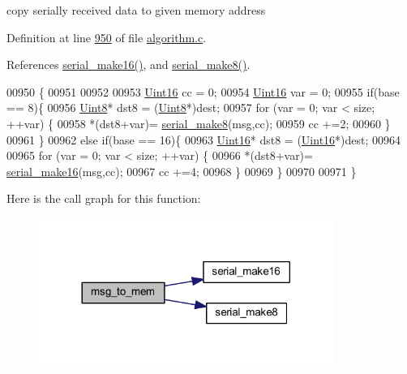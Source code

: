 copy serially received data to given memory address 



Definition at line \hyperlink{a00038_source_l00950}{950} of file \hyperlink{a00038_source}{algorithm.\+c}.



References \hyperlink{a00030_source_l00381}{serial\+\_\+make16()}, and \hyperlink{a00030_source_l00367}{serial\+\_\+make8()}.


\begin{DoxyCode}
00950                                                              \{
00951 
00952  
00953         \hyperlink{a00072_a59a9f6be4562c327cbfb4f7e8e18f08b}{Uint16} cc   = 0;
00954         \hyperlink{a00072_a59a9f6be4562c327cbfb4f7e8e18f08b}{Uint16} var  = 0;
00955         \textcolor{keywordflow}{if}(base == 8)\{
00956         \hyperlink{a00072_af84840501dec18061d18a68c162a8fa2}{Uint8}* dst8 = (\hyperlink{a00072_af84840501dec18061d18a68c162a8fa2}{Uint8}*)dest;
00957         \textcolor{keywordflow}{for} (var = 0; var < size; ++var) \{         
00958             *(dst8+var)= \hyperlink{a00031_aa76f5237babd71f1484bb2dbc6aa0f8d}{serial\_make8}(msg,cc);
00959             cc +=2;
00960         \}
00961         \}
00962         \textcolor{keywordflow}{else} \textcolor{keywordflow}{if}(base == 16)\{
00963         \hyperlink{a00072_a59a9f6be4562c327cbfb4f7e8e18f08b}{Uint16}* dst8 = (\hyperlink{a00072_a59a9f6be4562c327cbfb4f7e8e18f08b}{Uint16}*)dest;    
00964             
00965         \textcolor{keywordflow}{for} (var = 0; var < size; ++var) \{         
00966             *(dst8+var)= \hyperlink{a00031_abc17de32f14103a5be219df0d4ad9176}{serial\_make16}(msg,cc);
00967             cc +=4;
00968         \}
00969         \}
00970 
00971 \}
\end{DoxyCode}


Here is the call graph for this function\+:\nopagebreak
\begin{figure}[H]
\begin{center}
\leavevmode
\includegraphics[width=272pt]{d8/d41/a00038_a126f3d78a95341a19a3e862e57357952_cgraph}
\end{center}
\end{figure}




